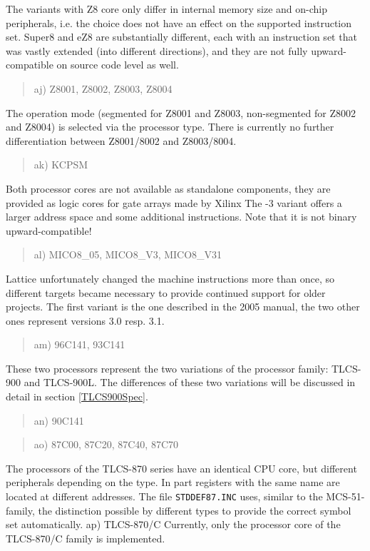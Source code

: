 \documentclass[12pt,twoside]{report}
\newcommand{\tty}[1]{{\tt #1}}
\begin{document}
The variants with Z8 core only differ in internal memory size and
on-chip peripherals, i.e. the choice does not have an effect on the
supported instruction set.  Super8 and eZ8 are substantially different,
each with an instruction set that was vastly extended (into different
directions), and they are not fully upward-compatible on source code
level as well.
\begin{quote}
aj) Z8001, Z8002, Z8003, Z8004
\end{quote}
The operation mode (segmented for Z8001 and Z8003, non-segmented for
Z8002 and Z8004) is selected via the processor type.  There is currently
no further differentiation between Z8001/8002 and Z8003/8004.
\begin{quote}
ak) KCPSM
\end{quote}
Both processor cores are not available as standalone components, they are
provided as logic cores for gate arrays made by Xilinx The -3 variant
offers a larger address space and some additional instructions.  Note that
it is not binary upward-compatible!
\begin{quote}
al) MICO8\_05, MICO8\_V3, MICO8\_V31
\end{quote}
Lattice unfortunately changed the machine instructions more than once, so
different targets became necessary to provide continued support for older
projects.  The first variant is the one described in the 2005 manual, the
two other ones represent versions 3.0 resp. 3.1.
\begin{quote}
am) 96C141, 93C141
\end{quote}
These two processors represent the two variations of the processor
family: TLCS-900 and TLCS-900L.  The differences of these two variations
will be discussed in detail in section \ref{TLCS900Spec}.
\begin{quote}
an) 90C141
\end{quote}
\begin{quote}
ao) 87C00, 87C20, 87C40, 87C70
\end{quote}
The processors of the TLCS-870 series have an identical CPU core, but
different peripherals depending on the type.  In part registers with
the same name are located at different addresses.  The file
\tty{STDDEF87.INC} uses, similar to the MCS-51-family, the distinction
possible by different types to provide the correct symbol set
automatically.
ap) TLCS-870/C
Currently, only the processor core of the TLCS-870/C family is
implemented.
\end{document}
